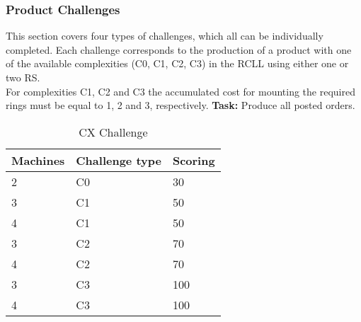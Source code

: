 \documentclass[12pt,twoside]{article}
\begin{document}
\subsubsection{Product Challenges}\label{sec:challenge-cx}
This section covers four types of challenges, which all can be individually
completed.
Each challenge corresponds to the production of a product with one of the
available complexities (C0, C1, C2, C3) in the \ac{RCLL} using either
one or two \ac{RS}.\\
For complexities C1, C2 and C3 the accumulated cost for mounting the required
rings must be equal to 1, 2 and 3, respectively.
\textbf{Task:} Produce all posted orders.\\
\begin{table}[!htb]
 \centering
 \begin{tabular}{l|l|l}
  Machines & Challenge type & Scoring \\\hline
  2 & C0 & 30 \\
  3 & C1 & 50 \\
  4 & C1 & 50 \\
  3 & C2 & 70 \\
  4 & C2 & 70 \\
  3 & C3 & 100 \\
  4 & C3 & 100 \\
 \end{tabular}
 \caption{CX Challenge}
 \label{tab:challenge-cx}
\end{table}
\end{document}

